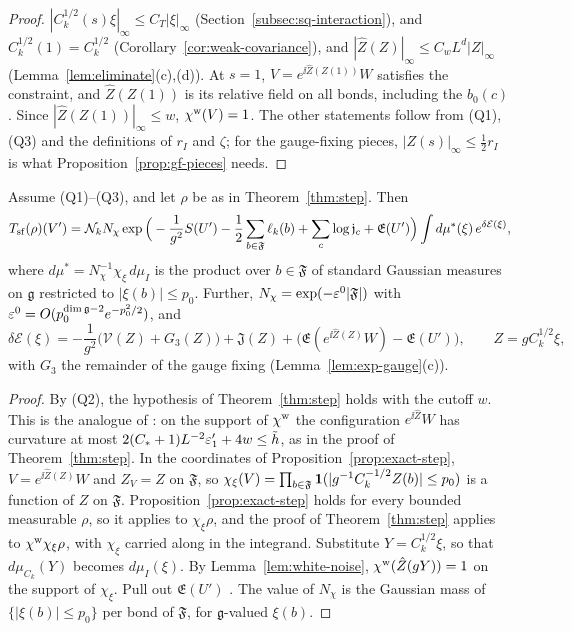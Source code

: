 \begin{proof}
$|C_k^{1/2}(s)\xi|_\infty\le C_T|\xi|_\infty$ (Section~\ref{subsec:sq-interaction}), and $C_k^{1/2}(1)=C_k^{1/2}$ (Corollary~\ref{cor:weak-covariance}), and $|\hat Z(Z)|_\infty\le C_wL^d|Z|_\infty$ (Lemma~\ref{lem:eliminate}(c),(d)). At $s=1$, $V=e^{\ii\hat Z(Z(1))}W$ satisfies the constraint, and $\hat Z(Z(1))$ is its relative field on all bonds, including the $b_0(c)$. Since $|\hat Z(Z(1))|_\infty\le w$, $\chi^{\rm w}(V)=1$. The other statements follow from (Q1), (Q3) and the definitions of $r_I$ and $\zeta$; for the gauge-fixing pieces, $|Z(s)|_\infty\le\frac12r_I$ is what Proposition~\ref{prop:gf-pieces} needs.
\end{proof}

\begin{proposition}\label{prop:small-field-step}
Assume (Q1)--(Q3), and let $\rho$ be as in Theorem~\ref{thm:step}. Then
\[
T_{\rm sf}(\rho)(V')=\mathcal N_kN_\chi\exp\Big(-\frac1{g^2}S(U')-\frac12\sum_{b\in\mathfrak F}\ell_k(b)+\sum_c\log\mathfrak j_c+\mathfrak E(U')\Big)\int d\mu^*(\xi)\,e^{\delta\mathcal E(\xi)},
\]
where $d\mu^*=N_\chi^{-1}\chi_\xi\,d\mu_I$ is the product over $b\in\mathfrak F$ of standard Gaussian measures on $\mathfrak g$ restricted to $|\xi(b)|\le p_0$. Further, $N_\chi=\exp(-\varepsilon^0|\mathfrak F|)$ with $\varepsilon^0=O(p_0^{\dim\mathfrak g-2}e^{-p_0^2/2})$, and
\[
\delta\mathcal E(\xi)=-\frac1{g^2}\big(\mathcal V(Z)+G_3(Z)\big)+\mathfrak J(Z)+\big(\mathfrak E(e^{\ii\hat Z(Z)}W)-\mathfrak E(U')\big),\qquad Z=gC_k^{1/2}\xi ,
\]
with $G_3$ the remainder of the gauge fixing (Lemma~\ref{lem:exp-gauge}(c)).
\end{proposition}

\begin{proof}
By (Q2), the hypothesis of Theorem~\ref{thm:step} holds with the cutoff $w$. This is the analogue of \cite[Lemma~15]{DimockI}: on the support of $\chi^{\rm w}$ the configuration $e^{\ii\hat Z}W$ has curvature at most $2(C_*+1)L^{-2}\varepsilon'_1+4w\le\tilde h$, as in the proof of Theorem~\ref{thm:step}. In the coordinates of Proposition~\ref{prop:exact-step}, $V=e^{\ii\hat Z(Z)}W$ and $Z_V=Z$ on $\mathfrak F$, so $\chi_\xi(V)=\prod_{b\in\mathfrak F}\mathbf 1(|g^{-1}C_k^{-1/2}Z(b)|\le p_0)$ is a function of $Z$ on $\mathfrak F$. Proposition~\ref{prop:exact-step} holds for every bounded measurable $\rho$, so it applies to $\chi_\xi\rho$, and the proof of Theorem~\ref{thm:step} applies to $\chi^{\rm w}\chi_\xi\rho$, with $\chi_\xi$ carried along in the integrand. Substitute $Y=C_k^{1/2}\xi$, so that $d\mu_{C_k}(Y)$ becomes $d\mu_I(\xi)$. By Lemma~\ref{lem:white-noise}, $\chi^{\rm w}(\hat Z(gY))=1$ on the support of $\chi_\xi$. Pull out $\mathfrak E(U')$ \cite[(211)--(212)]{DimockI}. The value of $N_\chi$ is the Gaussian mass of $\{|\xi(b)|\le p_0\}$ per bond of $\mathfrak F$, for $\mathfrak g$-valued $\xi(b)$.
\end{proof}

